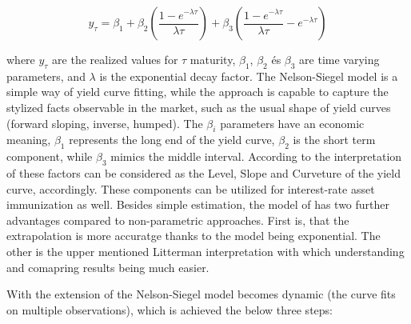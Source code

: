 \documentclass[12pt,bibliography=totoc]{article}
\begin{document}
\begin{equation}
y_{\tau}=\beta_{1}+\beta_{2}\left ( \frac{1-e^{-\lambda\tau}}{\lambda\tau} \right )+\beta_{3}\left ( \frac{1-e^{-\lambda\tau}}{\lambda\tau} -e^{-\lambda\tau}\right )
\end{equation}


where $y_{\tau}$ are the realized values for $\tau$ maturity, $\beta_{1}$, $\beta_{2}$ és $\beta_{3}$ are time varying parameters, and $\lambda$ is the exponential decay factor.
The Nelson-Siegel model is a simple way of yield curve fitting, while the approach is capable to capture the stylized facts observable in the market, such as the usual shape of yield curves (forward sloping, inverse, humped).
The $\beta_{i}$ parameters have an economic meaning, $\beta_{1}$ represents the long end of the yield curve,  $\beta_{2}$ is the short term component, while $\beta_{3}$ mimics the middle interval. According to the interpretation of \cite{litterman1991common} these factors can be considered as the Level, Slope and Curveture of the yield curve, accordingly. These components can be utilized for interest-rate asset immunization as well. Besides simple estimation, the model of \cite{diebold2006forecasting} has two further advantages compared to non-parametric approaches. First is, that the extrapolation is more accuratge thanks to the model being exponential. The other is the upper mentioned Litterman interpretation with which understanding and comapring results being much easier.
 
With the extension of \cite{diebold2006forecasting} the Nelson-Siegel model becomes dynamic (the curve fits on multiple observations), which is achieved  the below three steps:
\end{document}
